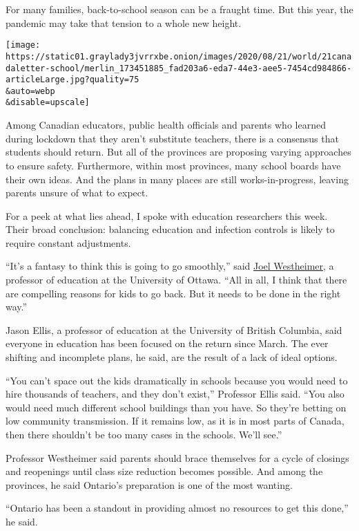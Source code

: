 For many families, back-to-school season can be a fraught time. But this
year, the pandemic may take that tension to a whole new height.

\texttt{[image: https://static01.graylady3jvrrxbe.onion/images/2020/08/21/world/21canadaletter-school/merlin\_173451885\_fad203a6-eda7-44e3-aee5-7454cd984866-articleLarge.jpg?quality=75\\\&auto=webp\\\&disable=upscale]}

Among Canadian educators, public health officials and parents who
learned during lockdown that they aren't substitute teachers, there is a
consensus that students should return. But all of the provinces are
proposing varying approaches to ensure safety. Furthermore, within most
provinces, many school boards have their own ideas. And the plans in
many places are still works-in-progress, leaving parents unsure of what
to expect.

For a peek at what lies ahead, I spoke with education researchers this
week. Their broad conclusion: balancing education and infection controls
is likely to require constant adjustments.

``It's a fantasy to think this is going to go smoothly,'' said
\href{https://research.uottawa.ca/people/westheimer-joel}{Joel
Westheimer,} a professor of education at the University of Ottawa. ``All
in all, I think that there are compelling reasons for kids to go back.
But it needs to be done in the right way.''

Jason Ellis, a professor of education at the University of British
Columbia, said everyone in education has been focused on the return
since March. The ever shifting and incomplete plans, he said, are the
result of a lack of ideal options.

``You can't space out the kids dramatically in schools because you would
need to hire thousands of teachers, and they don't exist,'' Professor
Ellis said. ``You also would need much different school buildings than
you have. So they're betting on low community transmission. If it
remains low, as it is in most parts of Canada, then there shouldn't be
too many cases in the schools. We'll see.''

Professor Westheimer said parents should brace themselves for a cycle of
closings and reopenings until class size reduction becomes possible. And
among the provinces, he said Ontario's preparation is one of the most
wanting.

``Ontario has been a standout in providing almost no resources to get
this done,'' he said.

